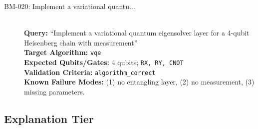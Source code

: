 \begin{description}
    \item[BM-020: Implement a variational quantu...] \ \\
    \textbf{Query:} ``Implement a variational quantum eigensolver layer for a 4-qubit Heisenberg chain with measurement'' \\
    \textbf{Target Algorithm:} \texttt{vqe} \\
    \textbf{Expected Qubits/Gates:} 4 qubits; \texttt{RX, RY, CNOT} \\
    \textbf{Validation Criteria:} \texttt{algorithm\_correct} \\
    \textbf{Known Failure Modes:} (1) no entangling layer, (2) no measurement, (3) missing parameters.

\end{description}


\subsection*{Explanation Tier}
